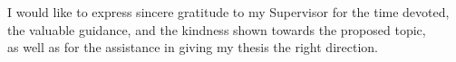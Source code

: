 \thispagestyle{empty}

\vspace*{\fill}

{
\raggedleft
I would like to express sincere gratitude to my Supervisor for the time devoted, \\
the valuable guidance, and the kindness shown towards the proposed topic, \\
as well as for the assistance in giving my thesis the right direction. \\
}

\vspace{5em}